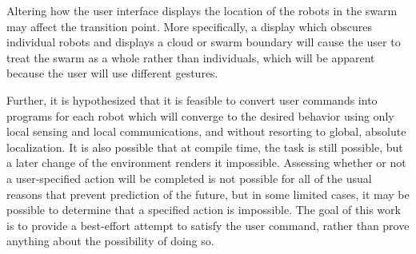 Altering how the user interface displays the location of the robots in the swarm may affect the transition point. 
More specifically, a display which obscures individual robots and displays a cloud or swarm boundary will cause the user to treat the swarm as a whole rather than individuals, which will be apparent because the user will use different gestures. 

Further, it is hypothesized that it is feasible to convert user commands into programs for each robot which will converge to the desired behavior using only local sensing and local communications, and without resorting to global, absolute localization. 
It is also possible that at compile time, the task is still possible, but a later change of the environment renders it impossible. 
Assessing whether or not a user-specified action will be completed is not possible for all of the usual reasons that prevent prediction of the future, but in some limited cases, it may be possible to determine that a specified action is impossible. The goal of this work is to provide a best-effort attempt to satisfy the user command, rather than prove anything about the possibility of doing so. 

